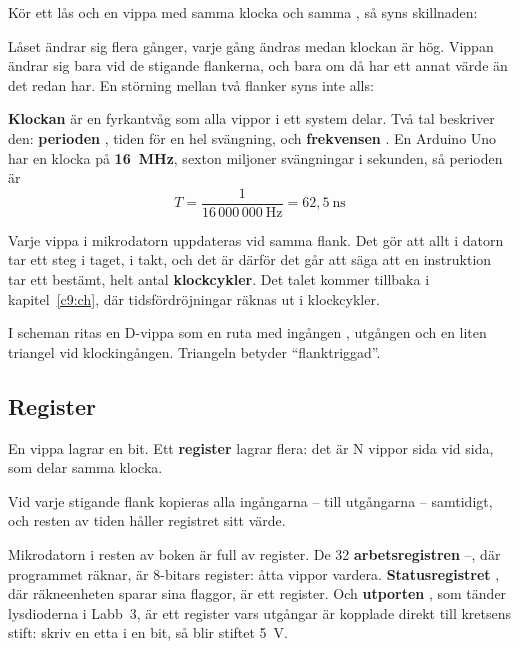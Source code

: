 Kör ett lås och en vippa med samma klocka och samma , så syns skillnaden:


Låset ändrar sig flera gånger, varje gång  ändras medan klockan är hög. Vippan ändrar sig
bara vid de stigande flankerna, och bara om  då har ett annat värde än det  redan
har. En störning mellan två flanker syns inte alls:


\textbf{Klockan} är en fyrkantvåg som alla vippor i ett system delar. Två tal beskriver den:
\textbf{perioden} , tiden för en hel svängning, och \textbf{frekvensen} . En
Arduino Uno har en klocka på \textbf{16~MHz}, sexton miljoner svängningar i sekunden, så perioden
är
\[
  T = \frac{1}{16\,000\,000\ \text{Hz}} = 62{,}5\ \text{ns}
\]

Varje vippa i mikrodatorn uppdateras vid samma flank. Det gör att allt i datorn tar ett steg i
taget, i takt, och det är därför det går att säga att en instruktion tar ett bestämt, helt antal
\textbf{klockcykler}. Det talet kommer tillbaka i kapitel~\ref{c9:ch}, där tidsfördröjningar
räknas ut i klockcykler.

I scheman ritas en D-vippa som en ruta med ingången , utgången  och en liten
triangel vid klockingången. Triangeln betyder \enquote{flanktriggad}.

\subsection{Register}
\label{c6:a6}
En vippa lagrar en bit. Ett \textbf{register} lagrar flera: det är N vippor sida vid sida, som delar
samma klocka.


Vid varje stigande flank kopieras alla ingångarna -- till utgångarna
-- samtidigt, och resten av tiden håller registret sitt värde.

Mikrodatorn i resten av boken är full av register. De 32 \textbf{arbetsregistren}
--, där programmet räknar, är 8-bitars register: åtta vippor vardera.
\textbf{Statusregistret} , där räkneenheten sparar sina flaggor, är ett register. Och
\textbf{utporten} , som tänder lysdioderna i Labb~3, är ett register vars utgångar är
kopplade direkt till kretsens stift: skriv en etta i en bit, så blir stiftet 5~V.

